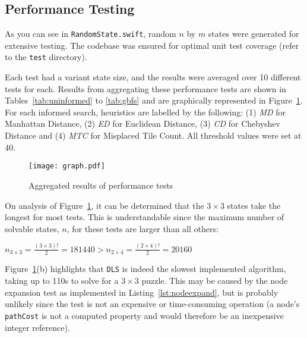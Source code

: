 \subsection{Performance Testing}
\label{sub:randomstategeneration}

As you can see in \texttt{RandomState.swift}, random $n$ by $m$ states were
generated for extensive testing. The codebase was ensured for optimal unit test
coverage (refer to the \texttt{test} directory).

Each test had a variant state size, and the results were averaged over 10
different tests for each. Results from aggregating these performance tests are
shown in Tables~\ref{tab:uninformed} to \ref{tab:gbfs} and are graphically
represented in Figure~\ref{fig:results}. For each informed search, heuristics
are labelled by the following: (1) \emph{MD} for Manhattan Distance, (2)
\emph{ED} for Euclidean Distance, (3) \emph{CD} for Chebyshev Distance and
(4) \emph{MTC} for Misplaced Tile Count. All threshold values were set at 40.

\begin{figure}[h!]
  \centering
  \texttt{[image: graph.pdf]}
  \caption{Aggregated results of performance tests}
  \label{fig:results}
\end{figure}

On analysis of Figure~\ref{fig:results}, it can be determined that the $3 \times 3$
states take the longest for most tests. This is understandable since the maximum
number of solvable states, $n$, for these tests are larger than all others:


\begin{center}
  \vspace{0.5em}
  \noindent
  $n_{3 \times 3} = \frac{( 3 \times 3 )!}{2} = 181440 > n_{2 \times 4} = \frac{( 2 \times 4 )!}{2} = 20160$
  \vspace{0.5em}
\end{center}

Figure~\ref{fig:results}(b) highlights that \texttt{DLS} is indeed the slowest
implemented algorithm, taking up to 110s to solve for a $3 \times 3$ puzzle. This
may be caused by the node expansion test as implemented in Listing~\ref{lst:nodeexpand},
but is probably unlikely since the test is not an expensive or time-consuming
operation (a node's \texttt{pathCost} is not a computed property and would therefore
be an inexpensive integer reference).



